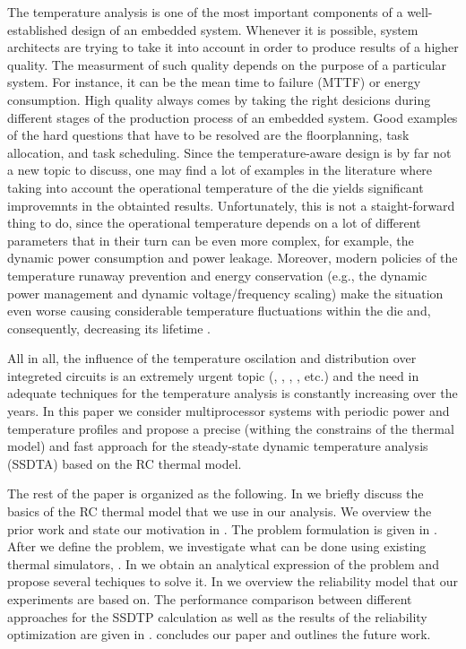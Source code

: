 The temperature analysis is one of the most important components of a well-established design of an embedded system. Whenever it is possible, system architects are trying to take it into account in order to produce results of a higher quality. The measurment of such quality depends on the purpose of a particular system. For instance, it can be the mean time to failure (MTTF) or energy consumption. High quality always comes by taking the right desicions during different stages of the production process of an embedded system. Good examples of the hard questions that have to be resolved are the floorplanning, task allocation, and task scheduling. Since the temperature-aware design is by far not a new topic to discuss, one may find a lot of examples in the literature where taking into account the operational temperature of the die yields significant improvemnts in the obtainted results. Unfortunately, this is not a staight-forward thing to do, since the operational temperature depends on a lot of different parameters that in their turn can be even more complex, for example, the dynamic power consumption and power leakage. Moreover, modern policies of the temperature runaway prevention and energy conservation (e.g., the dynamic power management and dynamic voltage/frequency scaling) make the situation even worse causing considerable temperature fluctuations within the die and, consequently, decreasing its lifetime \cite{simunic2005}.

All in all, the influence of the temperature oscilation and distribution over integreted circuits is an extremely urgent topic (\cite{hieu2004}, \cite{lu2004}, \cite{jedec2010}, \cite{xiang2010}, etc.) and the need in adequate techniques for the temperature analysis is constantly increasing over the years. In this paper we consider multiprocessor systems with periodic power and temperature profiles and propose a precise (withing the constrains of the thermal model) and fast approach for the steady-state dynamic temperature analysis (SSDTA) based on the RC thermal model.

The rest of the paper is organized as the following. In  we briefly discuss the basics of the RC thermal model that we use in our analysis. We overview the prior work and state our motivation in . The problem formulation is given in . After we define the problem, we investigate what can be done using existing thermal simulators, . In  we obtain an analytical expression of the problem and propose several techiques to solve it. In  we overview the reliability model that our experiments are based on. The performance comparison between different approaches for the SSDTP calculation as well as the results of the reliability optimization are given in .  concludes our paper and outlines the future work.
